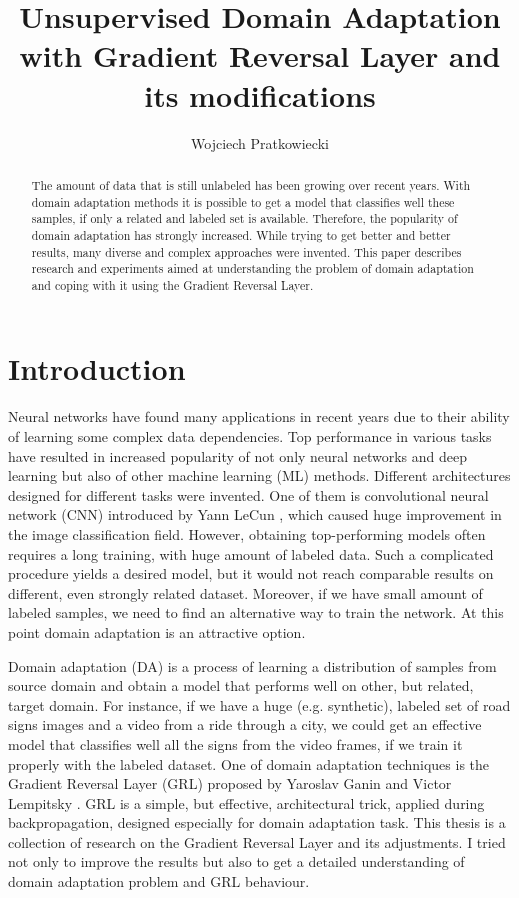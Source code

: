 \documentclass{article}
\title{Unsupervised Domain Adaptation with Gradient Reversal Layer and its modifications}
\author{Wojciech Pratkowiecki}
\begin{document}
\maketitle

\begin{abstract}
The amount of data that is still unlabeled has been growing over recent years. With domain adaptation methods it is possible to get a model that classifies well these samples, if only a related and labeled set is available. Therefore, the popularity of domain adaptation has strongly increased. While trying to get better and better results, many diverse and complex approaches were invented. This paper describes research and experiments aimed at understanding the problem of domain adaptation and coping with it using the Gradient Reversal Layer.
\end{abstract}

\section{Introduction}
Neural networks have found many applications in recent years due to their ability of learning some complex data dependencies. Top performance in various tasks have resulted in increased popularity of not only neural networks and deep learning but also of other machine learning (ML) methods. Different architectures designed for different tasks were invented. One of them is convolutional neural network (CNN) introduced by Yann LeCun \cite{cnn}, which caused huge improvement in the image classification field. However, obtaining top-performing models often requires a long training, with huge amount of labeled data. Such a complicated procedure yields a desired model, but it would not reach comparable results on different, even strongly related dataset. Moreover, if we  have small amount of labeled samples, we need to find an alternative way to train the network. At this point domain adaptation is an attractive option.
\par
Domain adaptation (DA) is a process of learning a distribution of samples from source domain and obtain a model that performs well on other, but related, target domain. For instance, if we have a huge (e.g. synthetic), labeled set of road signs images and a video from a ride through a city, we could get an effective model that classifies well all the signs from the video frames, if we train it properly with the labeled dataset. One of domain adaptation techniques is the Gradient Reversal Layer (GRL) proposed by Yaroslav Ganin and Victor Lempitsky \cite{pmlr-v37-ganin15}. GRL is a simple, but effective, architectural trick, applied during backpropagation, designed especially for domain adaptation task. This thesis is a collection of research on the Gradient Reversal Layer and its adjustments. I tried not only to improve the results but also to get a detailed understanding of domain adaptation problem and GRL behaviour.
\end{document}
